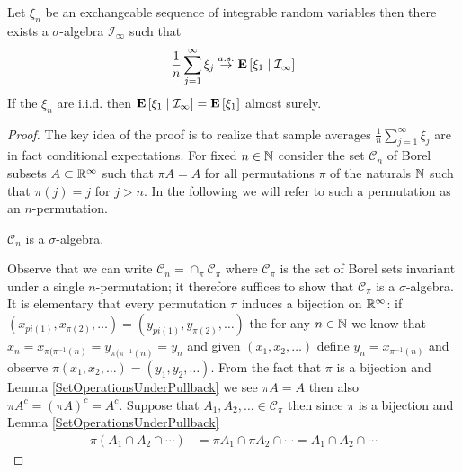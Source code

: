 \begin{thm}\label{SLLNExchangeableSequences}Let $\xi_n$ be an exchangeable sequence of integrable random variables then there exists a $\sigma$-algebra $\mathcal{I}_\infty$ such that
\begin{align*}
\frac{1}{n} \sum_{j=1}^\infty \xi_j \toas \cexpectationlong{\mathcal{I}_\infty}{\xi_1}
\end{align*}
If the $\xi_n$ are i.i.d. then $\cexpectationlong{\mathcal{I}_\infty}{\xi_1} = \expectation{\xi_1}$ almost surely.
\end{thm}
\begin{proof}
The key idea of the proof is to realize that sample averages $\frac{1}{n} \sum_{j=1}^\infty \xi_j$ are in fact conditional expectations.  For fixed $n \in \naturals$ consider the set
$\mathcal{C}_n$ of Borel subsets $A \subset \reals^\infty$ such that $\pi A = A$ for all permutations $\pi$ of the naturals $\naturals$ such that $\pi(j) = j$ for $j > n$.  In the following we will refer to such a permutation as an $n$-permutation.

\begin{clm}$\mathcal{C}_n$ is a $\sigma$-algebra.
\end{clm}
Observe that we can write $\mathcal{C}_n = \cap_\pi \mathcal{C}_\pi$ where $\mathcal{C}_\pi$ is the set of Borel sets invariant under a single $n$-permutation; it therefore suffices to show that $\mathcal{C}_\pi$ is a $\sigma$-algebra.  It is elementary that every permutation $\pi$ induces a bijection on $\reals^\infty$: if $(x_{pi(1)}, x_{\pi(2)}, \dotsc) = (y_{pi(1)}, y_{\pi(2)}, \dotsc)$ the for any $n \in \naturals$ we know that$x_n = x_{\pi(\pi^{-1}(n)} =  y_{\pi(\pi^{-1}(n)} = y_n$ and given $(x_1, x_2, \dotsc)$ define $y_n  = x_{\pi^{-1}(n)}$ and observe $\pi(x_1, x_2, \dotsc) = (y_1, y_2, \dotsc)$.  From the fact that $\pi$ is a bijection and Lemma \ref{SetOperationsUnderPullback} we see $\pi A = A$ then also $\pi A^c = (\pi A)^c = A^c$.  Suppose that $A_1, A_2, \dotsc \in \mathcal{C}_\pi$ then since $\pi$ is a bijection and Lemma \ref{SetOperationsUnderPullback} 
\begin{align*}
\pi(A_1 \cap A_2 \cap \dotsb) &= \pi A_1 \cap \pi A_2 \cap \dotsb = A_1 \cap A_2 \cap \dotsb 
\end{align*}


\end{proof}
